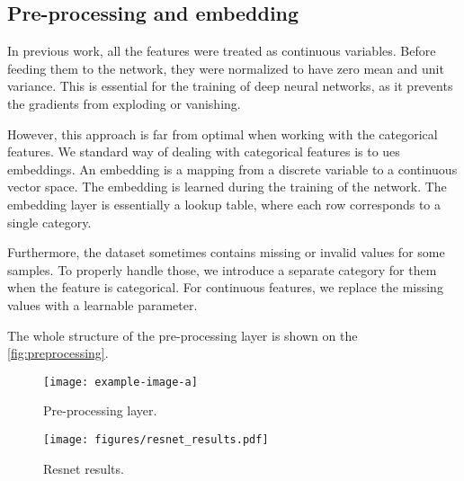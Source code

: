 \subsection{Pre-processing and embedding}

In previous work, all the features were treated as continuous variables. Before feeding them to the network, they were
normalized to have zero mean and unit variance. This is essential for the training of deep neural networks, as it
prevents the gradients from exploding or vanishing.

However, this approach is far from optimal when working with the categorical features. We standard way of dealing with
categorical features is to ues embeddings. An embedding is a mapping from a discrete variable to a continuous vector
space. The embedding is learned during the training of the network. The embedding layer is essentially a lookup table,
where each row corresponds to a single category.

Furthermore, the dataset sometimes contains missing or invalid values for some samples. To properly handle those, we
introduce a separate category for them when the feature is categorical. For continuous features, we replace the missing
values with a learnable parameter.

The whole structure of the pre-processing layer is shown on the \autoref{fig:preprocessing}.

\begin{figure}[htbp]
    \centering
    \texttt{[image: example-image-a]}
    \caption{Pre-processing layer.}
    \label{fig:preprocessing}
\end{figure}


\begin{figure}[htbp]
    \centering
    \texttt{[image: figures/resnet\_results.pdf]}
    \caption{Resnet results.}
    \label{fig:resnet_results}
\end{figure}
